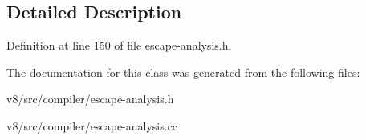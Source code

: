\subsection{Detailed Description}


Definition at line 150 of file escape-\/analysis.\+h.



The documentation for this class was generated from the following files\+:\begin{DoxyCompactItemize}
\item 
v8/src/compiler/escape-\/analysis.\+h\item 
v8/src/compiler/escape-\/analysis.\+cc\end{DoxyCompactItemize}
